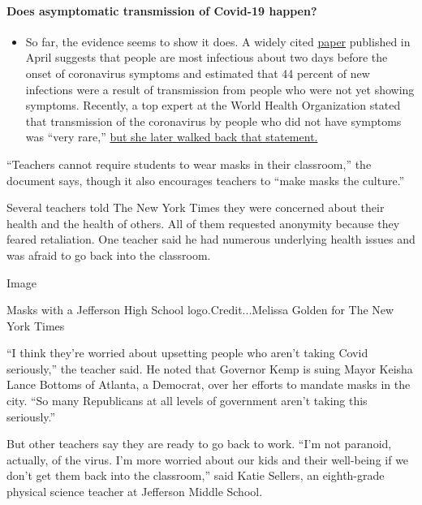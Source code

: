 \begin{itemize}
{  \paragraph{Does asymptomatic transmission of Covid-19
  happen?}\label{does-asymptomatic-transmission-of-covid-19-happen}}

  \begin{itemize}
  \tightlist
  \item
    So far, the evidence seems to show it does. A widely cited
    \href{https://www.nature.com/articles/s41591-020-0869-5}{paper}
    published in April suggests that people are most infectious about
    two days before the onset of coronavirus symptoms and estimated that
    44 percent of new infections were a result of transmission from
    people who were not yet showing symptoms. Recently, a top expert at
    the World Health Organization stated that transmission of the
    coronavirus by people who did not have symptoms was ``very rare,''
    \href{https://www.nytimes.com/2020/06/09/world/coronavirus-updates.html?action=click\&pgtype=Article\&state=default\&region=MAIN_CONTENT_3\&context=storylines_faq\#link-1f302e21}{but
    she later walked back that statement.}
  \end{itemize}
\end{itemize}

``Teachers cannot require students to wear masks in their classroom,''
the document says, though it also encourages teachers to ``make masks
the culture.''

Several teachers told The New York Times they were concerned about their
health and the health of others. All of them requested anonymity because
they feared retaliation. One teacher said he had numerous underlying
health issues and was afraid to go back into the classroom.

Image

Masks with a Jefferson High School logo.Credit...Melissa Golden for The
New York Times

``I think they're worried about upsetting people who aren't taking Covid
seriously,'' the teacher said. He noted that Governor Kemp is suing
Mayor Keisha Lance Bottoms of Atlanta, a Democrat, over her efforts to
mandate masks in the city. ``So many Republicans at all levels of
government aren't taking this seriously.''

But other teachers say they are ready to go back to work. ``I'm not
paranoid, actually, of the virus. I'm more worried about our kids and
their well-being if we don't get them back into the classroom,'' said
Katie Sellers, an eighth-grade physical science teacher at Jefferson
Middle School.

